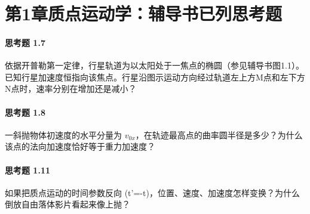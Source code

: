 \section*{第1章\quad 质点运动学：辅导书已列思考题}
\paragraph{思考题 1.7}
依据开普勒第一定律，行星轨道为以太阳处于一焦点的椭圆（参见辅导书图1.1）。已知行星加速度恒指向该焦点。行星沿图示运动方向经过轨道左上方M点和左下方N点时，速率分别在增加还是减小？

\paragraph{思考题 1.8}
一斜抛物体初速度的水平分量为 \(v_{0x}\)，在轨迹最高点的曲率圆半径是多少？为什么该点的法向加速度恰好等于重力加速度？

\paragraph{思考题 1.11}
如果把质点运动的时间参数反向 (t'=-t)，位置、速度、加速度怎样变换？为什么倒放自由落体影片看起来像上抛？
